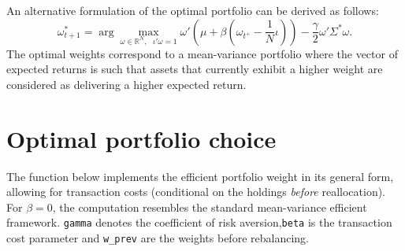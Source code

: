 \documentclass[
]{book}
\begin{document}
An alternative formulation of the optimal portfolio can be derived as follows:
\[\omega_{t+1} ^*=\arg\max_{\omega\in\mathbb{R}^N,\text{ }  \iota'\omega=1}
\omega'\left(\mu+\beta\left(\omega_{t^+} - \frac{1}{N}\iota\right)\right) - \frac{\gamma}{2}\omega'\Sigma^* \omega.\]
The optimal weights correspond to a mean-variance portfolio where the vector of expected returns is such that assets that currently exhibit a higher weight are considered as delivering a higher expected return.

\hypertarget{optimal-portfolio-choice}{%
\section{Optimal portfolio choice}\label{optimal-portfolio-choice}}

The function below implements the efficient portfolio weight in its general form, allowing for transaction costs (conditional on the holdings \emph{before} reallocation). For \(\beta=0\), the computation resembles the standard mean-variance efficient framework. \texttt{gamma} denotes the coefficient of risk aversion,\texttt{beta} is the transaction cost parameter and \texttt{w\_prev} are the weights before rebalancing.
\end{document}
